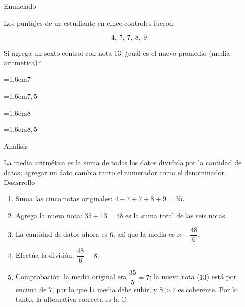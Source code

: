 \documentclass[10pt,a4paper,twocolumn]{article}
\newcommand{\alternativa}[2]{\par\noindent\hangindent=1.6em\hangafter=1\makebox[1.6em][l]{\tecla{#1}}#2\par}
\newcommand{\clave}[1]{\par\smallskip{\sffamily\footnotesize\color{esmeralda} Clave \teclaok{#1}}\par}
\begin{document}
\begin{ejemplo}
{\sffamily\footnotesize\color{zinc500} Enunciado}\par
Los puntajes de un estudiante en cinco controles fueron:

\[4,\ 7,\ 7,\ 8,\ 9\]

Si agrega un sexto control con nota 13, ¿cuál es el nuevo promedio (media aritmética)?
\alternativa{A}{$7$}
\alternativa{B}{$7{,}5$}
\alternativa{C}{$8$}
\alternativa{D}{$8{,}5$}
\clave{C}
{\sffamily\footnotesize\color{zinc500} Análisis}\par La media aritmética es la suma de todos los datos dividida por la cantidad de datos; agregar un dato cambia tanto el numerador como el denominador.
{\sffamily\footnotesize\color{zinc500} Desarrollo}
\begin{enumerate}
  \item Suma las cinco notas originales: $4 + 7 + 7 + 8 + 9 = 35$.
  \item Agrega la nueva nota: $35 + 13 = 48$ es la suma total de las seis notas.
  \item La cantidad de datos ahora es $6$, así que la media es $\bar{x} = \dfrac{48}{6}$.
  \item Efectúa la división: $\dfrac{48}{6} = 8$.
  \item Comprobación: la media original era $\dfrac{35}{5} = 7$; la nueva nota ($13$) está por encima de $7$, por lo que la media debe subir, y $8 > 7$ es coherente. Por lo tanto, la alternativa correcta es la C.
\end{enumerate}
\end{ejemplo}
\end{document}
